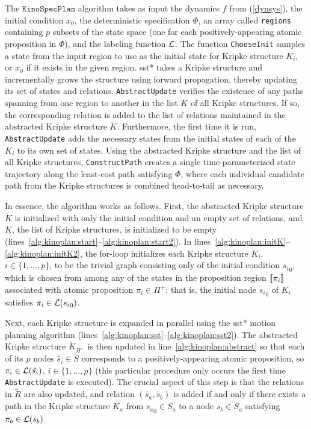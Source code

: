 The $\texttt{KinoSpecPlan}$ algorithm takes as input the dynamics $f$ from (\ref{dynsys}), the initial condition $x_0$, the deterministic \mucalc{} specification $\Phi$, an array called \texttt{regions} containing $p$ subsets of the state space (one for each positively-appearing atomic proposition in $\Phi$), and the labeling function $\mathcal{L}$. The function \texttt{ChooseInit} samples a state from the input region to use as the initial state for Kripke structure $K_i$, or $x_0$ if it exists in the given region. \gls{sst}* takes a Kripke structure and incrementally grows the structure using forward propagation, thereby updating its set of states and relations. \texttt{AbstractUpdate} verifies the existence of any paths spanning from one region to another in the list $K$ of all Kripke structures. If so, the corresponding relation is added to the list of relations maintained in the abstracted Kripke structure $\tilde{K}$. Furthermore, the first time it is run, \texttt{AbstractUpdate} adds the necessary states from the initial states of each of the $K_i$ to its own set of states. Using the abstracted Kripke structure and the list of all Kripke structures, \texttt{ConstructPath} creates a single time-parameterized state trajectory along the least-cost path satisfying $\Phi$, where each individual candidate path from the Kripke structures is combined head-to-tail as necessary. 

In essence, the algorithm works as follows. First, the abstracted Kripke structure $\tilde{K}$ is initialized with only the initial condition and an empty set of relations, and $K$, the list of Kripke structures, is initialized to be empty (lines~\ref{alg:kinoplan:start}--\ref{alg:kinoplan:start2}). In lines~\ref{alg:kinoplan:initK}--\ref{alg:kinoplan:initK2}, the for-loop initializes each Kripke structure $K_i$, $i \in \{ 1,\ldots,p \}$, to be the trivial graph consisting only of the initial condition ${s_i}_0$, which is chosen from among any of the states in the proposition region ${\llbracket}{} \pi_i {\rrbracket}{}$ associated with atomic proposition $\pi_i \in \Pi^+$; that is, the initial node ${s_i}_0$ of $K_i$ satisfies $\pi_i \in \mathcal{L}({s_i}_0)$.

Next, each Kripke structure is expanded in parallel using the \gls{sst}* motion planning algorithm (lines~\ref{alg:kinoplan:sst}--\ref{alg:kinoplan:sst2}).
The abstracted Kripke structure $\tilde{K}_{\Pi^+}$ is then updated in line~\ref{alg:kinoplan:abstract} so that each of its $p$ nodes $\tilde{s_i} \in \tilde{S}$ corresponds to a positively-appearing atomic proposition, so $\pi_i \in \mathcal{L}(\tilde{s_i})$, $i \in \{ 1, \ldots, p \}$ (this particular procedure only occurs the first time \texttt{AbstractUpdate} is executed). 
The crucial aspect of this step is that the relations in $\tilde{R}$ are also updated, and relation $(\tilde{s_a}, \tilde{s_b})$ is added if and only if there exists a path in the Kripke structure $K_a$ from ${s_a}_0 \in S_a$ to a node ${s_b} \in S_a$ satisfying $\pi_b \in \mathcal{L}(s_b)$.

